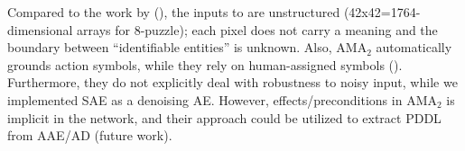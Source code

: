 
Compared to the work by \citeauthor{KonidarisKL14} (\citeyear{KonidarisKL14}),
the inputs to \latentplanner are unstructured (42x42=1764-dimensional arrays for 8-puzzle);
each pixel does not carry a meaning and the boundary between ``identifiable entities'' is unknown.
Also, AMA$_2$ automatically grounds action symbols, while they rely on human-assigned symbols ().
Furthermore, they do not explicitly deal with robustness to noisy input, while we implemented SAE as a denoising AE.
However, effects/preconditions in AMA$_2$ is implicit in the network, and their approach could be utilized to extract PDDL from AAE/AD (future work).


%

